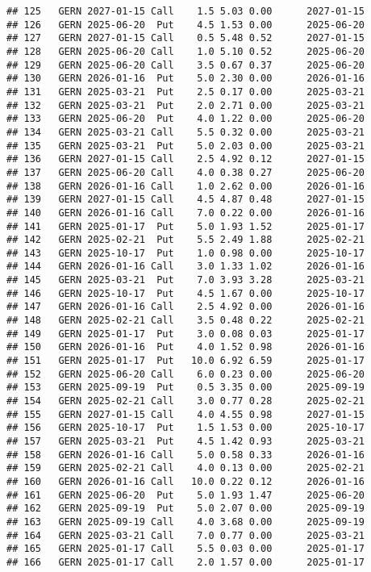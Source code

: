 \documentclass[
]{article}
\begin{document}
\begin{verbatim}
## 125   GERN 2027-01-15 Call    1.5 5.03 0.00      2027-01-15
## 126   GERN 2025-06-20  Put    4.5 1.53 0.00      2025-06-20
## 127   GERN 2027-01-15 Call    0.5 5.48 0.52      2027-01-15
## 128   GERN 2025-06-20 Call    1.0 5.10 0.52      2025-06-20
## 129   GERN 2025-06-20 Call    3.5 0.67 0.37      2025-06-20
## 130   GERN 2026-01-16  Put    5.0 2.30 0.00      2026-01-16
## 131   GERN 2025-03-21  Put    2.5 0.17 0.00      2025-03-21
## 132   GERN 2025-03-21  Put    2.0 2.71 0.00      2025-03-21
## 133   GERN 2025-06-20  Put    4.0 1.22 0.00      2025-06-20
## 134   GERN 2025-03-21 Call    5.5 0.32 0.00      2025-03-21
## 135   GERN 2025-03-21  Put    5.0 2.03 0.00      2025-03-21
## 136   GERN 2027-01-15 Call    2.5 4.92 0.12      2027-01-15
## 137   GERN 2025-06-20 Call    4.0 0.38 0.27      2025-06-20
## 138   GERN 2026-01-16 Call    1.0 2.62 0.00      2026-01-16
## 139   GERN 2027-01-15 Call    4.5 4.87 0.48      2027-01-15
## 140   GERN 2026-01-16 Call    7.0 0.22 0.00      2026-01-16
## 141   GERN 2025-01-17  Put    5.0 1.93 1.52      2025-01-17
## 142   GERN 2025-02-21  Put    5.5 2.49 1.88      2025-02-21
## 143   GERN 2025-10-17  Put    1.0 0.98 0.00      2025-10-17
## 144   GERN 2026-01-16 Call    3.0 1.33 1.02      2026-01-16
## 145   GERN 2025-03-21  Put    7.0 3.93 3.28      2025-03-21
## 146   GERN 2025-10-17  Put    4.5 1.67 0.00      2025-10-17
## 147   GERN 2026-01-16 Call    2.5 4.92 0.00      2026-01-16
## 148   GERN 2025-02-21 Call    3.5 0.48 0.22      2025-02-21
## 149   GERN 2025-01-17  Put    3.0 0.08 0.03      2025-01-17
## 150   GERN 2026-01-16  Put    4.0 1.52 0.98      2026-01-16
## 151   GERN 2025-01-17  Put   10.0 6.92 6.59      2025-01-17
## 152   GERN 2025-06-20 Call    6.0 0.23 0.00      2025-06-20
## 153   GERN 2025-09-19  Put    0.5 3.35 0.00      2025-09-19
## 154   GERN 2025-02-21 Call    3.0 0.77 0.28      2025-02-21
## 155   GERN 2027-01-15 Call    4.0 4.55 0.98      2027-01-15
## 156   GERN 2025-10-17  Put    1.5 1.53 0.00      2025-10-17
## 157   GERN 2025-03-21  Put    4.5 1.42 0.93      2025-03-21
## 158   GERN 2026-01-16 Call    5.0 0.58 0.33      2026-01-16
## 159   GERN 2025-02-21 Call    4.0 0.13 0.00      2025-02-21
## 160   GERN 2026-01-16 Call   10.0 0.22 0.12      2026-01-16
## 161   GERN 2025-06-20  Put    5.0 1.93 1.47      2025-06-20
## 162   GERN 2025-09-19  Put    5.0 2.07 0.00      2025-09-19
## 163   GERN 2025-09-19 Call    4.0 3.68 0.00      2025-09-19
## 164   GERN 2025-03-21 Call    7.0 0.77 0.00      2025-03-21
## 165   GERN 2025-01-17 Call    5.5 0.03 0.00      2025-01-17
## 166   GERN 2025-01-17 Call    2.0 1.57 0.00      2025-01-17

\end{verbatim}
\end{document}
